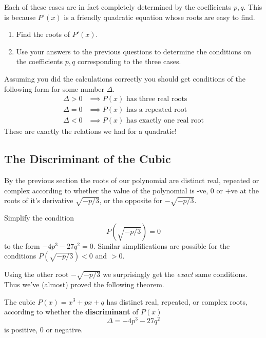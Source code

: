 Each of these cases are in fact completely determined by the coefficients $ p,q$. This is because $ P'(x)$ is a friendly quadratic equation whose roots are easy to find.
\begin{questions}[resume]
  \item \begin{enumerate}
  	\item Find the roots of $ P'(x)$.
		\item Use your answers to the previous questions to determine the conditions on the coefficients $ p,q$ corresponding to the three cases.
  \end{enumerate}
\end{questions}

Assuming you did the calculations correctly you should get conditions of the following form for some number $ \Delta$.
\begin{align*}
	\Delta > 0 & \implies P(x) \mbox{ has three real roots} \\
	\Delta = 0 & \implies P(x) \mbox{ has a repeated root}   \\
	\Delta < 0 & \implies P(x) \mbox{ has exactly one real root}   
\end{align*}
These are exactly the relations we had for a quadratic! 


\newpage
\subsection{The Discriminant of the Cubic}
By the previous section the roots of our polynomial are distinct real, repeated or complex according to whether the value of the polynomial is -ve, 0 or +ve at the roots of it's derivative $ \sqrt {{-p}/{3}}$, or the opposite for $ -\sqrt {{-p}/{3}}$.

\begin{questions}[resume]
  \item Simplify the condition $$P \left(\sqrt {{-p}/{3}}\right)= 0$$ to the form $ -4p^3 - 27q^2 = 0$. Similar simplifications are possible for the conditions $P (\sqrt {{-p}/{3}}) < 0$ and $> 0$.
\end{questions}

Using the other root $ -\sqrt {{-p}/{3}}$ we surprisingly get the \emph{exact} same conditions. Thus we've (almost) proved the following theorem.
\begin{thm}
	The cubic $ P(x) = x^3 + px + q$ has distinct real, repeated, or complex roots, according to whether the \textbf{discriminant} of $ P(x)$ $$ \Delta = -4p^3 - 27q^2$$ is positive, 0 or negative. 
\end{thm}


